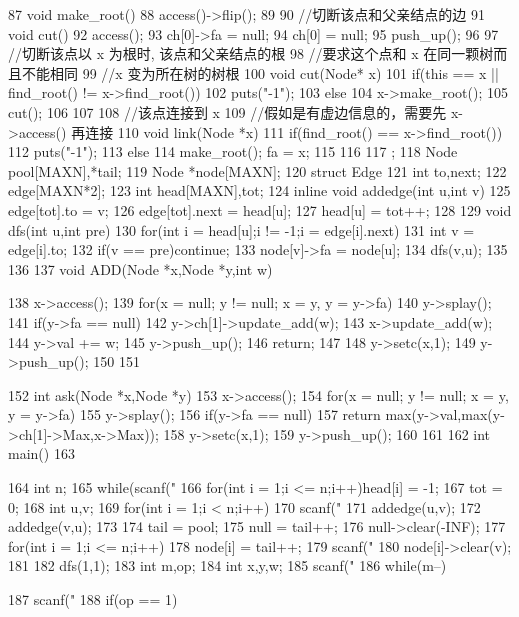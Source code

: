 \documentclass[11pt]{article}
\begin{document}
\begin{Code}
{ 87       void make_root(){
 88           access()->flip();
 89       }
 90       //切断该点和父亲结点的边
 91       void cut(){
 92           access();
 93           ch[0]->fa = null;
 94           ch[0] = null;
 95           push_up();
 96       }
 97       //切断该点以 x 为根时, 该点和父亲结点的根
 98       //要求这个点和 x 在同一颗树而且不能相同
 99       //x 变为所在树的树根
100       void cut(Node* x){
101           if(this == x || find_root() != x->find_root())
102               puts("-1");
103           else {
104               x->make_root();
105               cut();
106           }
107       }
108       //该点连接到 x
109       //假如是有虚边信息的，需要先 x->access() 再连接
110       void link(Node *x){
111           if(find_root() == x->find_root())
112               puts("-1");
113           else {
114               make_root(); fa = x;
115           }
116       }
117   };
118   Node pool[MAXN],*tail;
119   Node *node[MAXN];
120   struct Edge{
121       int to,next;
122   }edge[MAXN*2];
123   int head[MAXN],tot;
124   inline void addedge(int u,int v){
125       edge[tot].to = v;
126       edge[tot].next = head[u];
127       head[u] = tot++;
128   }
129   void dfs(int u,int pre){
130       for(int i = head[u];i != -1;i = edge[i].next){
131           int v = edge[i].to;
132           if(v == pre)continue;
133           node[v]->fa = node[u];
134           dfs(v,u);
135       }
136   }
137   void ADD(Node *x,Node *y,int w){


138       x->access();
139       for(x = null; y != null; x = y, y = y->fa){
140           y->splay();
141           if(y->fa == null){
142               y->ch[1]->update_add(w);
143               x->update_add(w);
144               y->val += w;
145               y->push_up();
146               return;
147           }
148           y->setc(x,1);
149           y->push_up();
150       }
151   }
152   int ask(Node *x,Node *y){
153       x->access();
154       for(x = null; y != null; x = y, y = y->fa){
155           y->splay();
156           if(y->fa == null)
157               return max(y->val,max(y->ch[1]->Max,x->Max));
158           y->setc(x,1);
159           y->push_up();
160       }
161   }
162   int main()
163   {
164       int n;
165       while(scanf("%
166           for(int i = 1;i <= n;i++)head[i] = -1;
167           tot = 0;
168           int u,v;
169           for(int i = 1;i < n;i++){
170               scanf("%
171               addedge(u,v);
172               addedge(v,u);
173           }
174           tail = pool;
175           null = tail++;
176           null->clear(-INF);
177           for(int i = 1;i <= n;i++){
178               node[i] = tail++;
179               scanf("%
180               node[i]->clear(v);
181           }
182           dfs(1,1);
183           int m,op;
184           int x,y,w;
185           scanf("%
186           while(m--){
187               scanf("%
188               if(op == 1){


}}}
\end{Code}
\end{document}
